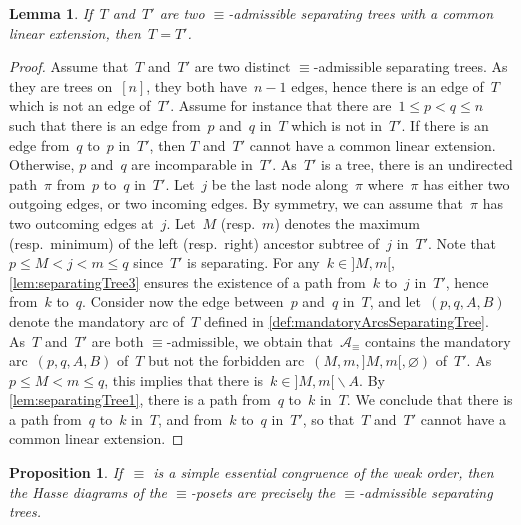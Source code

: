 \documentclass{amsart}
\newtheorem{proposition}[theorem]{Proposition}
\newtheorem{lemma}[theorem]{Lemma}
\theoremstyle{definition}
\newcommand{\ssm}{\smallsetminus} %
\newcommand{\arcs}{{\mathcal{A}}} %
\begin{document}
\begin{lemma}
\label{lem:admissibleSeparatingTreesWithCommonLinearExtensions}
If~$T$ and~$T'$ are two $\equiv$-admissible separating trees with a common linear extension, then~${T = T'}$.
\end{lemma}

\begin{proof}
Assume that~$T$ and~$T'$ are two distinct $\equiv$-admissible separating trees. 
As they are trees on~$[n]$, they both have~$n-1$ edges, hence there is an edge of~$T$ which is not an edge of~$T'$.
Assume for instance that there are~$1 \le p < q \le n$ such that there is an edge from~$p$ and~$q$ in~$T$ which is not in~$T'$.
If there is an edge from~$q$ to~$p$ in~$T'$, then $T$ and~$T'$ cannot have a common linear extension.
Otherwise, $p$ and~$q$ are incomparable in~$T'$.
As~$T'$ is a tree, there is an undirected path~$\pi$ from~$p$ to~$q$ in~$T'$.
Let~$j$ be the last node along~$\pi$ where~$\pi$ has either two outgoing edges, or two incoming edges.
By symmetry, we can assume that~$\pi$ has two outcoming edges at~$j$.
Let~$M$ (resp.~$m$) denotes the maximum (resp.~minimum) of the left (resp.~right) ancestor subtree of~$j$ in~$T'$.
Note that~$p \le M < j < m \le q$ since~$T'$ is separating.
For any~$k \in {]M,m[}$, \cref{lem:separatingTree3} ensures the existence of a path from~$k$ to~$j$ in~$T'$, hence from~$k$ to~$q$.
Consider now the edge between~$p$ and~$q$ in~$T$, and let~$(p, q, A, B)$ denote the mandatory arc of~$T$ defined in \cref{def:mandatoryArcsSeparatingTree}.
As~$T$ and~$T'$ are both $\equiv$-admissible, we obtain that~$\arcs_\equiv$ contains the mandatory arc~$(p, q, A, B)$ of~$T$ but not the forbidden arc~$(M, m, {]M,m[}, \varnothing)$ of~$T'$.
As~$p \le M < m \le q$, this implies that there is~$k \in {]M,m[} \ssm A$.
By \cref{lem:separatingTree1}, there is a path from~$q$ to~$k$ in~$T$.
We conclude that there is a path from~$q$ to~$k$ in~$T$, and from~$k$ to~$q$ in~$T'$, so that~$T$ and~$T'$ cannot have a common linear extension.
\end{proof}

\begin{proposition}
\label{prop:admissibleSeparatingTrees}
If~$\equiv$ is a simple essential congruence of the weak order, then the Hasse diagrams of the $\equiv$-posets are precisely the $\equiv$-admissible separating trees.
\end{proposition}
\end{document}
